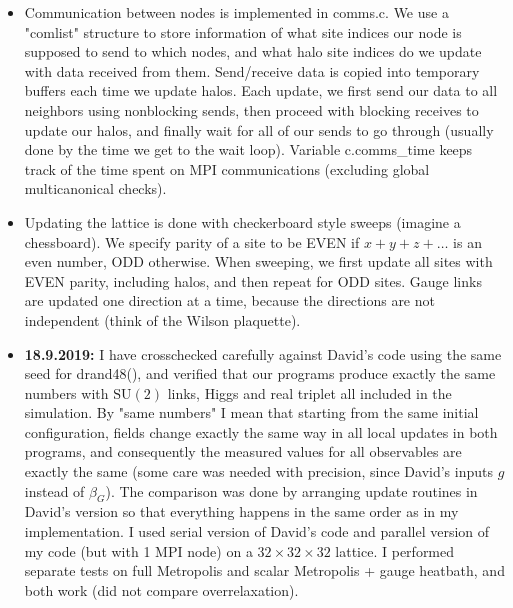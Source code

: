 \documentclass[11pt,a4paper]{article}
\newcommand\gr[1]{\mathrm{#1}}%
\begin{document}
\begin{itemize}
	\item Communication between nodes is implemented in comms.c. We use a "comlist" structure to store information of what site indices our node is supposed to send to which nodes, and what halo site indices do we update with data received from them. Send/receive data is copied into temporary buffers each time we update halos. Each update, we first send our data to all neighbors using nonblocking sends, then proceed with blocking receives to update our halos, and finally wait for all of our sends to go through (usually done by the time we get to the wait loop). Variable c.comms\_time keeps track of the time spent on MPI communications (excluding global multicanonical checks).
	
	\item Updating the lattice is done with checkerboard style sweeps (imagine a chessboard). We specify parity of a site to be EVEN if $x + y + z + \dots $ is an even number, ODD otherwise. When sweeping, we first update all sites with EVEN parity, including halos, and then repeat for ODD sites. Gauge links are updated one direction at a time, because the directions are not independent (think of the Wilson plaquette).  
	
	\item \textbf{18.9.2019:} I have crosschecked carefully against David's code using the same seed for drand48(), and verified that our programs produce exactly the same numbers with $\gr{SU(2)}$ links, Higgs and real triplet all included in the simulation. By "same numbers" I mean that starting from the same initial configuration, fields change exactly the same way in all local updates in both programs, and consequently the measured values for all observables are exactly the same (some care was needed with precision, since David's inputs $g$ instead of $\beta_G$). The comparison was done by arranging update routines in David's version so that everything happens in the same order as in my implementation. I used serial version of David's code and parallel version of my code (but with 1 MPI node) on a $32 \times 32 \times 32$ lattice. I performed separate tests on full Metropolis and scalar Metropolis + gauge heatbath, and both work (did not compare overrelaxation).

	
\end{itemize}
\end{document}
